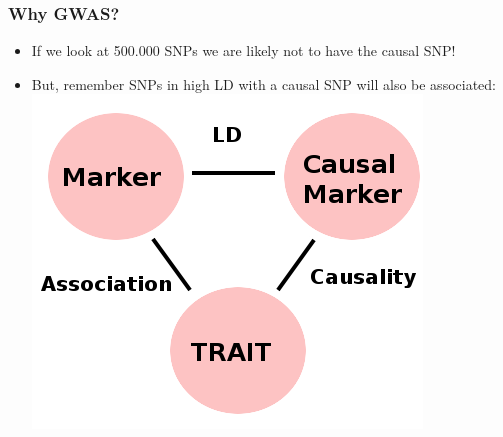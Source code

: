 \documentclass[xcolor=pdftex,dvipsnames,table,10pt]{beamer}
\begin{document}
\begin{frame}
  \frametitle{Why GWAS?}
\vspace{-.1cm}
  \small 
    \begin{itemize}\setlength{\itemindent}{-1.5em}
    \item If we look at 500.000 SNPs we are likely not to have the causal SNP!\\\vspace{0.2cm}
    \item But, remember SNPs in high LD with a causal SNP will also be associated: \\ \vspace{0.3cm}       
      \hspace{1cm} \includegraphics[scale=.35,trim = 0mm 0mm 0mm 0mm, clip]{asso.png}\\\vspace{0.15cm}
      
     \end{itemize}  
\end{frame}
\end{document}
